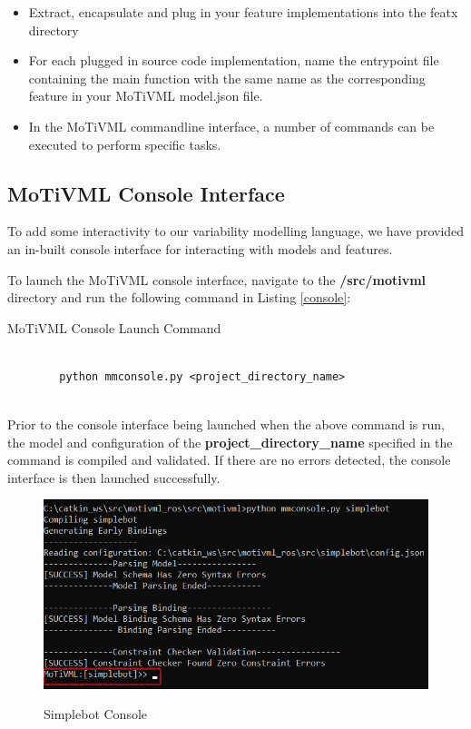 \documentclass{article}
\newenvironment{longlisting}{\captionsetup{type=listing}}{}
\begin{document}
\begin{itemize}
	\item Extract, encapsulate and plug in your feature implementations into the featx directory
	
	\item For each plugged in source code implementation, name the entrypoint file containing the main function with the same name as the corresponding feature in your MoTiVML model.json file.
	
	\item In the MoTiVML commandline interface, a number of commands can be executed to perform specific tasks.
\end{itemize}

\subsection{MoTiVML Console Interface}
To add some interactivity to our variability modelling language, we have provided an in-built console interface for interacting with models and features.

To launch the MoTiVML console interface, navigate to the \textbf{/src/motivml} directory and run the following command in Listing \ref{console}:

\begin{longlisting}
	\caption{MoTiVML Console Launch Command}
	\begin{verbatim}
		
		python mmconsole.py <project_directory_name>
		
	\end{verbatim}
	\label{console}
\end{longlisting}

Prior to the console interface being launched when the above command is run, the model and configuration of the \textbf{project\_directory\_name} specified in the command is compiled and validated. If there are no errors detected, the console interface is then launched successfully. 

\begin{figure}[H]
	\caption{Simplebot Console}
	\centering
	\includegraphics[width=\columnwidth]{images/console.png}
	\label{consolelaunch}
\end{figure}
\end{document}
